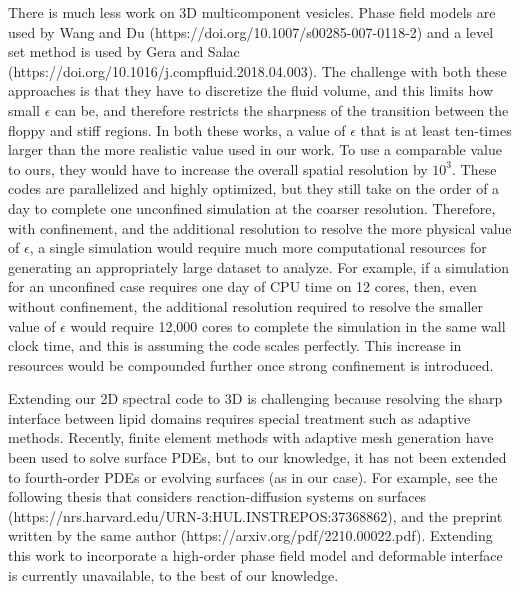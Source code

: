 \documentclass[11pt]{article}
\begin{document}
\begin{enumerate}
There is much less work on 3D multicomponent vesicles. Phase field
models are used by Wang and Du
(https://doi.org/10.1007/s00285-007-0118-2) and a level set method is
used by Gera and Salac
(https://doi.org/10.1016/j.compfluid.2018.04.003). The challenge with
both these approaches is that they have to discretize the fluid volume,
and this limits how small $\epsilon$ can be, and therefore restricts
the sharpness of the transition between the floppy and stiff
regions. In both these works, a value of $\epsilon$ that is at least
ten-times larger than the more realistic value used in our work. To use
a comparable value to ours, they would have to increase the overall
spatial resolution by $10^3$. These codes are parallelized and highly
optimized, but they still take on the order of a day to complete one
unconfined simulation at the coarser resolution. Therefore, with
confinement, and the additional resolution to resolve the more physical
value of $\epsilon$, a single simulation would require much more
computational resources for generating an appropriately large dataset to
analyze. For example, if a simulation for an unconfined case requires
one day of CPU time on 12 cores, then, even without confinement, the
additional resolution required to resolve the smaller value of
$\epsilon$ would require 12,000 cores to complete the simulation in the
same wall clock time, and this is assuming the code scales perfectly.
This increase in resources would be compounded further once strong
confinement is introduced.

Extending our 2D spectral code to 3D is challenging because resolving
the sharp interface between lipid domains requires special treatment
such as adaptive methods. Recently, finite element methods with adaptive
mesh generation have been used to solve surface PDEs, but to our
knowledge, it has not been extended to fourth-order PDEs or evolving
surfaces (as in our case). For example, see the following thesis that
considers reaction-diffusion systems on surfaces
(https://nrs.harvard.edu/URN-3:HUL.INSTREPOS:37368862), and the preprint
written by the same author (https://arxiv.org/pdf/2210.00022.pdf).
Extending this work to incorporate a high-order phase field model and
deformable interface is currently unavailable, to the best of our
knowledge.


%


\end{enumerate}
\end{document}
